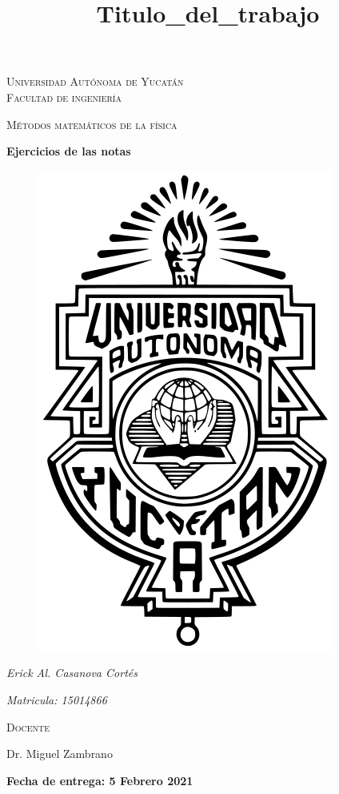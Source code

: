 \documentclass[11pt]{report}
\theoremstyle{plain}
\theoremstyle{definition}
\begin{document}
\begin{titlepage}
\title{Titulo_del_trabajo}


	\centering
	{\scshape\LARGE Universidad Autónoma de Yucatán  \\ Facultad de ingeniería\par}
	\vspace{1cm}
	{\scshape\Large Métodos matemáticos de la física\par}
	\vspace{1.5cm}
	{\huge\bfseries Ejercicios de las notas\par}
	\vspace{0.7cm}
	{\begin{figure}[!h]
	\centering
    \includegraphics[scale=0.3]{UADY.png}
	\end{figure}}
	\vspace{0.7cm}
	{\Large\itshape Erick Al. Casanova Cortés\par}
	{\Large\itshape Matricula: 15014866\par}
	\vfill
	{\scshape\Large Docente\par
	Dr. Miguel Zambrano\par}
	\vfill
	{\Large{\bfseries Fecha de entrega: 5 Febrero 2021} }

	\vfill
	
\end{titlepage}
\end{document}
